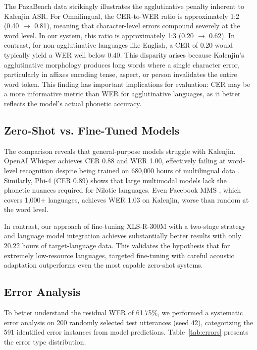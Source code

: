 \documentclass[conference]{IEEEtran}
\begin{document}
The PazaBench data strikingly illustrates the agglutinative penalty inherent to Kalenjin ASR. For Omnilingual, the CER-to-WER ratio is approximately 1:2 (0.40 $\rightarrow$ 0.81), meaning that character-level errors compound severely at the word level. In our system, this ratio is approximately 1:3 (0.20 $\rightarrow$ 0.62). In contrast, for non-agglutinative languages like English, a CER of 0.20 would typically yield a WER well below 0.40. This disparity arises because Kalenjin's agglutinative morphology produces long words where a single character error, particularly in affixes encoding tense, aspect, or person invalidates the entire word token. This finding has important implications for evaluation: CER may be a more informative metric than WER for agglutinative languages, as it better reflects the model's actual phonetic accuracy.

\subsection{Zero-Shot vs. Fine-Tuned Models}

The comparison reveals that general-purpose models struggle with Kalenjin. OpenAI Whisper achieves CER 0.88 and WER 1.00, effectively failing at word-level recognition despite being trained on 680,000 hours of multilingual data \cite{b2}. Similarly, Phi-4 (CER 0.89) shows that large multimodal models lack the phonetic nuances required for Nilotic languages. Even Facebook MMS \cite{b37}, which covers 1,000+ languages, achieves WER 1.03 on Kalenjin, worse than random at the word level.

In contrast, our approach of fine-tuning XLS-R-300M with a two-stage strategy and language model integration achieves substantially better results with only 20.22 hours of target-language data. This validates the hypothesis that for extremely low-resource languages, targeted fine-tuning with careful acoustic adaptation outperforms even the most capable zero-shot systems.

\subsection{Error Analysis}

To better understand the residual WER of 61.75\%, we performed a systematic error analysis on 200 randomly selected test utterances (seed 42), categorizing the 591 identified error instances from model predictions. Table~\ref{tab:errors} presents the error type distribution.
\end{document}
